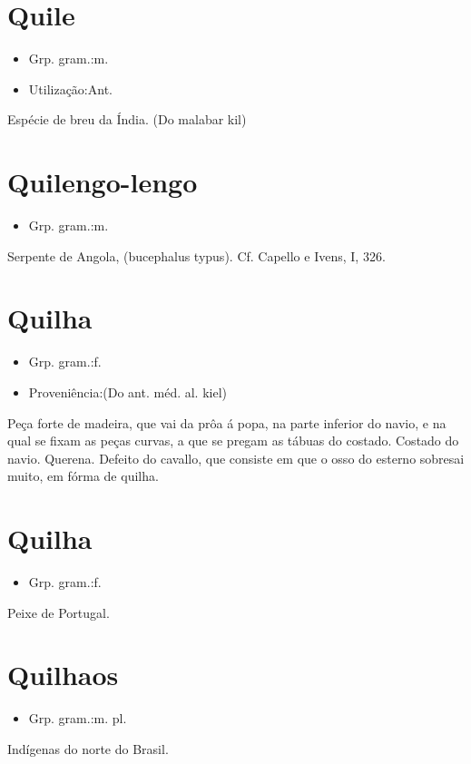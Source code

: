 \section{Quile}
\begin{itemize}
\item {Grp. gram.:m.}
\end{itemize}
\begin{itemize}
\item {Utilização:Ant.}
\end{itemize}
Espécie de breu da Índia.
(Do malabar \textunderscore kil\textunderscore )
\section{Quilengo-lengo}
\begin{itemize}
\item {Grp. gram.:m.}
\end{itemize}
Serpente de Angola, (\textunderscore bucephalus typus\textunderscore ). Cf. Capello e Ivens, I, 326.
\section{Quilha}
\begin{itemize}
\item {Grp. gram.:f.}
\end{itemize}
\begin{itemize}
\item {Proveniência:(Do ant. méd. al. \textunderscore kiel\textunderscore )}
\end{itemize}
Peça forte de madeira, que vai da prôa á popa, na parte inferior do navio, e na qual se fixam as peças curvas, a que se pregam as tábuas do costado.
Costado do navio.
Querena.
Defeito do cavallo, que consiste em que o osso do esterno sobresai muito, em fórma de quilha.
\section{Quilha}
\begin{itemize}
\item {Grp. gram.:f.}
\end{itemize}
Peixe de Portugal.
\section{Quilhaos}
\begin{itemize}
\item {Grp. gram.:m. pl.}
\end{itemize}
Indígenas do norte do Brasil.
